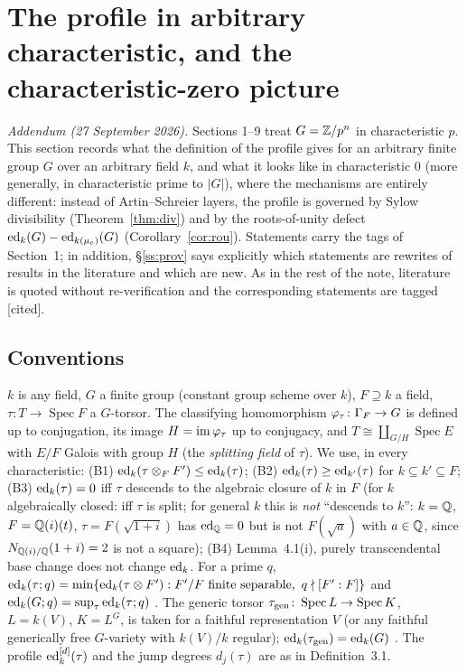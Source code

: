 \section{The profile in arbitrary characteristic, and the characteristic-zero picture}

\noindent\textit{Addendum (27 September 2026).} Sections 1--9 treat $G=\mathbb Z/p^n$ in
characteristic $p$. This section records what the definition of the profile gives for
an arbitrary finite group $G$ over an arbitrary field $k$, and what it looks like in
characteristic $0$ (more generally, in characteristic prime to $|G|$), where the
mechanisms are entirely different: instead of Artin--Schreier layers, the profile is
governed by Sylow divisibility (Theorem~\ref{thm:div}) and by the roots-of-unity
defect $\operatorname{ed}_k(G)-\operatorname{ed}_{k(\mu_e)}(G)$ (Corollary~\ref{cor:rou}). Statements carry the
tags of Section~1; in addition, \S\ref{ss:prov} says explicitly which statements are
rewrites of results in the literature and which are new. As in the rest of the note,
literature is quoted without re-verification and the corresponding statements are
tagged [cited].

\subsection{Conventions}\label{ss:conv}
$k$ is any field, $G$ a finite group (constant group scheme over $k$), $F\supseteq k$
a field, $\tau\colon T\to\operatorname{Spec}F$ a $G$-torsor. The classifying
homomorphism $\varphi_\tau\colon\Gamma_F\to G$ is defined up to conjugation, its image
$H=\operatorname{im}\varphi_\tau$ up to conjugacy, and $T\cong\coprod_{G/H}\operatorname{Spec}E$
with $E/F$ Galois with group $H$ (the \emph{splitting field} of $\tau$). We use, in
every characteristic: (B1) $\operatorname{ed}_k(\tau\otimes_FF')\le\operatorname{ed}_k(\tau)$; (B2)
$\operatorname{ed}_k(\tau)\ge\operatorname{ed}_{k'}(\tau)$ for $k\subseteq k'\subseteq F$; (B3) $\operatorname{ed}_k(\tau)=0$
iff $\tau$ descends to the algebraic closure of $k$ in $F$ (for $k$ algebraically
closed: iff $\tau$ is split; for general $k$ this is \emph{not} ``descends to $k$'':
$k=\mathbb Q$, $F=\mathbb Q(i)(t)$, $\tau=F(\sqrt{1+i})$ has $\operatorname{ed}_\mathbb Q=0$ but is not
$F(\sqrt a)$ with $a\in\mathbb Q$, since $N_{\mathbb Q(i)/\mathbb Q}(1+i)=2$ is not a square); (B4)
Lemma~4.1(i), purely transcendental base change does not change $\operatorname{ed}_k$. For a prime
$q$, $\operatorname{ed}_k(\tau;q)=\min\{\operatorname{ed}_k(\tau\otimes F'):F'/F\text{ finite separable},\
q\nmid[F':F]\}$ and $\operatorname{ed}_k(G;q)=\sup_\tau\operatorname{ed}_k(\tau;q)$ \cite[(2.5)]{RS}.
The generic torsor $\tau_{\mathrm{gen}}\colon\operatorname{Spec}L\to\operatorname{Spec}K$,
$L=k(V)$, $K=L^G$, is taken for a faithful representation $V$ (or any faithful
generically free $G$-variety with $k(V)/k$ regular); $\operatorname{ed}_k(\tau_{\mathrm{gen}})=\operatorname{ed}_k(G)$
\cite{BF,Me}. The profile $\operatorname{ed}^{[d]}_k(\tau)$ and the jump degrees $d_j(\tau)$ are as in
Definition~3.1.

